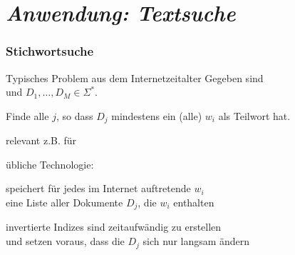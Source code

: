 \begin{frame}
    \end{frame}

  \section[\protect\emph{Textsuche}]{\protect\emph{Anwendung: Textsuche}}

    \begin{frame}
      \frametitle{Stichwortsuche}
      
      \begin{exampleblock}{Typisches Problem aus dem Internetzeitalter}
        Gegeben sind  \\
        und  $D_1,\dots,D_M \in \Sigma^*$.
        \par\smallskip
        Finde alle $j$, so dass $D_j$ mindestens ein (alle) $w_i$ als Teilwort hat.
      \end{exampleblock}
    
      \begin{Itemize}
        \item
          relevant z.B. für 
        \item
          übliche Technologie: 
          \par\smallskip
          speichert für jedes im Internet auftretende $w_i$ \\
          eine Liste aller Dokumente $D_j$, die $w_i$ enthalten
        \item
          invertierte Indizes sind zeitaufwändig zu erstellen\\
          und setzen voraus, dass die $D_j$ sich nur langsam ändern
      \end{Itemize}
    \end{frame}


